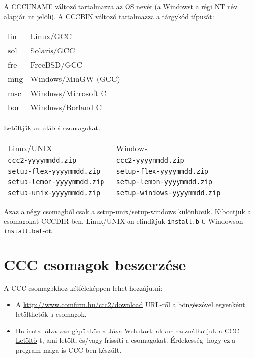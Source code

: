 A CCCUNAME változó tartalmazza az OS nevét (a Windowst a régi NT 
név alapján nt jelöli). A CCCBIN változó tartalmazza a tárgykód típusát:
\begin{center}
\begin{tabular}{|l|l|}
     lin & Linux/GCC \\
     sol & Solaris/GCC \\
     fre & FreeBSD/GCC \\
     mng & Windows/MinGW (GCC) \\
     msc & Windows/Microsoft C \\
     bor & Windows/Borland C \\
\end{tabular}
\end{center}


\href{http://www.comfirm.hu/ccc2/download}{Letöltjük} az alábbi csomagokat:
\begin{center}
\begin{tabular}{|l|l|}
     Linux/UNIX                     & Windows\\
     \tt ccc2-yyyymmdd.zip          & \tt ccc2-yyyymmdd.zip \\
     \tt setup-flex-yyyymmdd.zip    & \tt setup-flex-yyyymmdd.zip \\
     \tt setup-lemon-yyyymmdd.zip   & \tt setup-lemon-yyyymmdd.zip \\
     \tt setup-unix-yyyymmdd.zip    & \tt setup-windows-yyyymmdd.zip \\
\end{tabular}
\end{center}

Azaz a négy csomagból csak a setup-unix/setup-windows különbözik.
Kibontjuk a csomagokat CCCDIR-ben.
Linux/UNIX-on elindítjuk \verb!install.b!-t, Windowson
\verb!install.bat!-ot.



\section{CCC csomagok beszerzése}
 
A CCC csomagokhoz kétféleképpen lehet hozzájutni:
\begin{itemize}
\item 
  A \href{http://www.comfirm.hu/ccc2/download}{http://www.comfirm.hu/ccc2/download}
  URL-ről a böngészővel egyenként letölthetők a csomagok.
\item 
  Ha installálva van gépünkön a Jáva Webstart, akkor használhatjuk a
  \href{http://www.comfirm.hu/jnlp/cccdown.jnlp}{CCC Letöltő}-t,
  ami letölti és/vagy frissíti a csomagokat.
  Érdekesség, hogy ez a program maga is CCC-ben készült.
\end{itemize}


